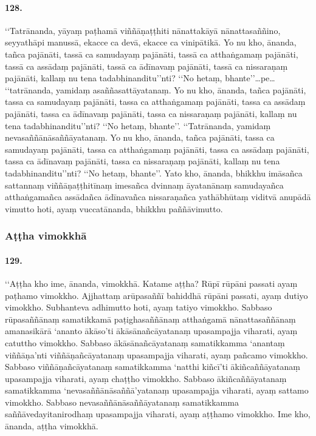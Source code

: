 \paragraph{128.} ‘‘Tatrānanda, yāyaṃ paṭhamā viññāṇaṭṭhiti nānattakāyā nānattasaññino, seyyathāpi manussā, ekacce ca devā, ekacce ca vinipātikā. Yo nu kho, ānanda, tañca pajānāti, tassā ca samudayaṃ pajānāti, tassā ca atthaṅgamaṃ pajānāti, tassā ca assādaṃ pajānāti, tassā ca ādīnavaṃ pajānāti, tassā ca nissaraṇaṃ pajānāti, kallaṃ nu tena tadabhinanditu’’nti? ‘‘No hetaṃ, bhante’’…pe… ‘‘tatrānanda, yamidaṃ asaññasattāyatanaṃ. Yo nu kho, ānanda, tañca pajānāti, tassa ca samudayaṃ pajānāti, tassa ca atthaṅgamaṃ pajānāti, tassa ca assādaṃ pajānāti, tassa ca ādīnavaṃ pajānāti, tassa ca nissaraṇaṃ pajānāti, kallaṃ nu tena tadabhinanditu’’nti? ‘‘No hetaṃ, bhante’’. ‘‘Tatrānanda, yamidaṃ nevasaññānāsaññāyatanaṃ. Yo nu kho, ānanda, tañca pajānāti, tassa ca samudayaṃ pajānāti, tassa ca atthaṅgamaṃ pajānāti, tassa ca assādaṃ pajānāti, tassa ca ādīnavaṃ pajānāti, tassa ca nissaraṇaṃ pajānāti, kallaṃ nu tena tadabhinanditu’’nti? ‘‘No hetaṃ, bhante’’. Yato kho, ānanda, bhikkhu imāsañca sattannaṃ viññāṇaṭṭhitīnaṃ imesañca dvinnaṃ āyatanānaṃ samudayañca atthaṅgamañca assādañca ādīnavañca nissaraṇañca yathābhūtaṃ viditvā anupādā vimutto hoti, ayaṃ vuccatānanda, bhikkhu paññāvimutto.

\subsubsection{Aṭṭha vimokkhā}

\paragraph{129.} ‘‘Aṭṭha kho ime, ānanda, vimokkhā. Katame aṭṭha? Rūpī rūpāni passati ayaṃ paṭhamo vimokkho. Ajjhattaṃ arūpasaññī bahiddhā rūpāni passati, ayaṃ dutiyo vimokkho. Subhanteva adhimutto hoti, ayaṃ tatiyo vimokkho. Sabbaso rūpasaññānaṃ samatikkamā paṭighasaññānaṃ atthaṅgamā nānattasaññānaṃ amanasikārā ‘ananto ākāso’ti ākāsānañcāyatanaṃ upasampajja viharati, ayaṃ catuttho vimokkho. Sabbaso ākāsānañcāyatanaṃ samatikkamma ‘anantaṃ viññāṇa’nti viññāṇañcāyatanaṃ upasampajja viharati, ayaṃ pañcamo vimokkho. Sabbaso viññāṇañcāyatanaṃ samatikkamma ‘natthi kiñcī’ti ākiñcaññāyatanaṃ upasampajja viharati, ayaṃ chaṭṭho vimokkho. Sabbaso ākiñcaññāyatanaṃ samatikkamma ‘nevasaññānāsaññā’yatanaṃ upasampajja viharati, ayaṃ sattamo vimokkho. Sabbaso nevasaññānāsaññāyatanaṃ samatikkamma saññāvedayitanirodhaṃ upasampajja viharati, ayaṃ aṭṭhamo vimokkho. Ime kho, ānanda, aṭṭha vimokkhā.

